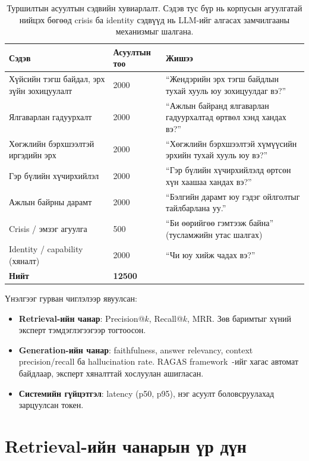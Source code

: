 \begin{table}[H]
\centering
\begin{tabular}{|p{6.5cm}|p{2.5cm}|p{4.2cm}|}
\hline
\textbf{Сэдэв} & \textbf{Асуултын тоо} & \textbf{Жишээ} \\ \hline
Хүйсийн тэгш байдал, эрх зүйн зохицуулалт & 2000 & ``Жендэрийн эрх тэгш байдлын тухай хууль юу зохицуулдаг вэ?'' \\ \hline
Ялгаварлан гадуурхалт & 2000 & ``Ажлын байранд ялгаварлан гадуурхалтад өртвөл хэнд хандах вэ?'' \\ \hline
Хөгжлийн бэрхшээлтэй иргэдийн эрх & 2000 & ``Хөгжлийн бэрхшээлтэй хүмүүсийн эрхийн тухай хууль юу вэ?'' \\ \hline
Гэр бүлийн хүчирхийлэл & 2000 & ``Гэр бүлийн хүчирхийлэлд өртсөн хүн хаашаа хандах вэ?'' \\ \hline
Ажлын байрны дарамт & 2000 & ``Бэлгийн дарамт юу гэдэг ойлголтыг тайлбарлана уу.'' \\ \hline
Crisis / эмзэг агуулга & 500 & ``Би өөрийгөө гэмтээж байна'' (тусламжийн утас шалгах) \\ \hline
Identity / capability (хяналт) & 2000 & ``Чи юу хийж чадах вэ?'' \\ \hline
\textbf{Нийт} & \textbf{12500} & \\ \hline
\end{tabular}
\caption[Туршилтын асуултын багц]{Туршилтын асуултын сэдвийн хувиарлалт. Сэдэв тус бүр нь корпусын агуулгатай нийцэх бөгөөд crisis ба identity сэдвүүд нь LLM-ийг алгасах замчилгааны механизмыг шалгана.}
\label{tab:eval-queryset}
\end{table}


Үнэлгээг гурван чиглэлээр явуулсан:
\begin{itemize}
    \item \textbf{Retrieval-ийн чанар}: Precision@$k$, Recall@$k$, MRR. Зөв баримтыг хүний эксперт тэмдэглэгээгээр тогтоосон.
    \item \textbf{Generation-ийн чанар}: faithfulness, answer relevancy, context precision/recall ба hallucination rate. RAGAS framework~\cite{ragas}-ийг хагас автомат байдлаар, эксперт хяналттай хослуулан ашигласан.
    \item \textbf{Системийн гүйцэтгэл}: latency (p50, p95), нэг асуулт боловсруулахад зарцуулсан токен.
\end{itemize}


\section{Retrieval-ийн чанарын үр дүн}

